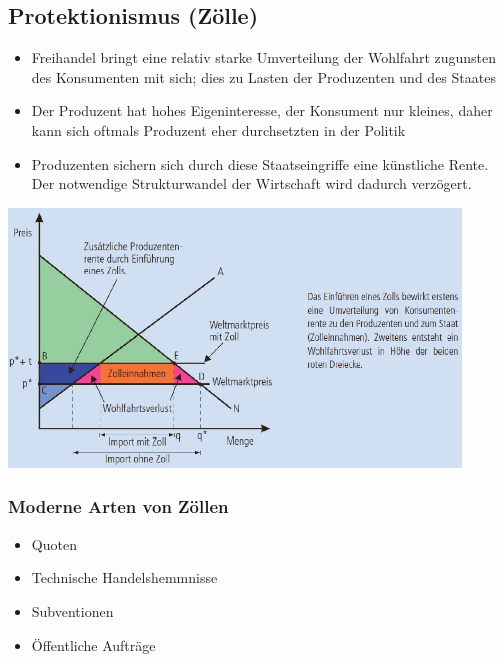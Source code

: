 \subsection{Protektionismus (Zölle)}
\begin{minipage}{7cm}
	\begin{itemize}
		\item Freihandel bringt eine relativ starke Umverteilung der Wohlfahrt zugunsten des Konsumenten mit sich; dies zu Lasten der Produzenten und des Staates
		\item Der Produzent hat hohes Eigeninteresse, der Konsument nur kleines, daher kann sich oftmals Produzent eher durchsetzten in der Politik
		\item Produzenten sichern sich durch diese Staatseingriffe eine künstliche Rente. Der notwendige Strukturwandel der Wirtschaft wird dadurch verzögert.
	\end{itemize}
\end{minipage}
\begin{minipage}{12cm}
		\includegraphics[width=12cm]{images/zolle.jpg}
\end{minipage}
\subsubsection{Moderne Arten von Zöllen}
\begin{itemize}
	\item Quoten
	\item Technische Handelshemmnisse
	\item Subventionen
	\item Öffentliche Aufträge
\end{itemize}
